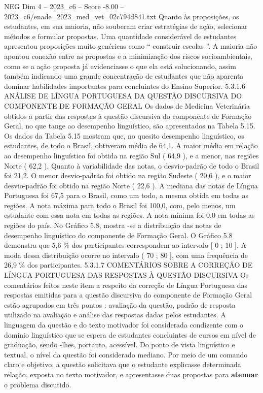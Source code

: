 \begin{textsample}{NEG Dim 4 – 2023\_c6 – Score -8.00 – 2023\_c6/enade\_2023\_med\_vet\_02c794d841.txt}
Quanto às proposições, os estudantes, em sua maioria, não souberam criar estratégias de ação, selecionar métodos e formular propostas.
Uma quantidade considerável de estudantes apresentou proposições muito genéricas como “ construir escolas ”.
A maioria não apontou conexão entre as propostas e a minimização dos riscos socioambientais, como se a ação proposta já evidenciasse o que ela está solucionando, assim também indicando uma grande concentração de estudantes que não aparenta dominar habilidades importantes para concluintes do Ensino Superior. 5.3.1.6 ANÁLISE DE LÍNGUA PORTUGUESA DA QUESTÃO DISCURSIVA DO COMPONENTE DE FORMAÇÃO GERAL Os dados de Medicina Veterinária obtidos a partir das respostas à questão discursiva do componente de Formação Geral, no que tange ao desempenho linguístico, são apresentados na Tabela 5.15.
Os dados da Tabela 5.15 mostram que, no quesito desempenho linguístico, os estudantes, de todo o Brasil, obtiveram média de 64,1.
A maior média em relação ao desempenho linguístico foi obtida na região Sul ( 64,9 ), e a menor, nas regiões Norte ( 62,2 ).
Quanto à variabilidade das notas, o desvio-padrão de todo o Brasil foi 21,2.
O menor desvio-padrão foi obtido na região Sudeste ( 20,6 ), e o maior desvio-padrão foi obtido na região Norte ( 22,6 ).
A mediana das notas de Língua Portuguesa foi 67,5 para o Brasil, como um todo, a mesma obtida em todas as regiões.
A nota máxima para todo o Brasil foi 100,0, com, pelo menos, um estudante com essa nota em todas as regiões.
A nota mínima foi 0,0 em todas as regiões do país.
No Gráfico 5.8, mostra -se a distribuição das notas de desempenho linguístico do componente de Formação Geral.
O Gráfico 5.8 demonstra que 5,6 \% dos participantes correspondem ao intervalo [ 0 ; 10 ].
A moda dessa distribuição ocorre no intervalo ( 70 ; 80 ], com uma frequência de 26,9 \% dos participantes. 5.3.1.7 COMENTÁRIOS SOBRE A CORREÇÃO DE LÍNGUA PORTUGUESA DAS RESPOSTAS À QUESTÃO DISCURSIVA Os comentários feitos neste item a respeito da correção de Língua Portuguesa das respostas emitidas para a questão discursiva do componente de Formação Geral estão agrupados em três pontos : avaliação da questão, padrão de resposta utilizado na avaliação e análise das respostas dadas pelos estudantes.
A linguagem da questão e do texto motivador foi considerada condizente com o domínio linguístico que se espera de estudantes concluintes de cursos em nível de graduação, sendo -lhes, portanto, acessível.
Do ponto de vista linguístico e textual, o nível da questão foi considerado mediano.
Por meio de um comando claro e objetivo, a questão solicitava que o estudante explicasse determinada relação, exposta no texto motivador, e apresentasse duas propostas para \textbf{atenuar} o problema discutido.

\end{textsample}
